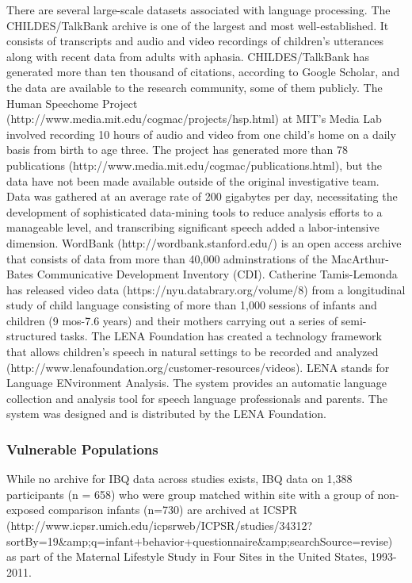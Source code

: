 \documentclass[letterpaper,man,apacite]{apa6}
\begin{document}
There are several large-scale datasets associated with language processing.
The CHILDES/TalkBank \cite{macwhinney_childes_2001} archive is one of the largest and most well-established.
It consists of transcripts and audio and video recordings of children's utterances along with recent data from adults with aphasia.
CHILDES/TalkBank has generated more than ten thousand of citations, according to Google Scholar, and the data are available to the research community, some of them publicly.
The Human Speechome Project (http://www.media.mit.edu/cogmac/projects/hsp.html) at MIT's Media Lab involved recording 10 hours of audio and video from one child's home on a daily basis from birth to age three.
The project has generated more than 78 publications (http://www.media.mit.edu/cogmac/publications.html), but the data have not been made available outside of the original investigative team.
Data was gathered at an average rate of 200 gigabytes per day, necessitating the development of sophisticated data-mining tools to reduce analysis efforts to a manageable level, and transcribing significant speech added a labor-intensive dimension.
WordBank (http://wordbank.stanford.edu/) is an open access archive that consists of data from more than 40,000 adminstrations of the MacArthur-Bates Communicative Development Inventory (CDI).
Catherine Tamis-Lemonda has released video data (https://nyu.databrary.org/volume/8) from a longitudinal study of child language consisting of more than 1,000 sessions of infants and children (9 mos-7.6 years) and their mothers carrying out a series of semi-structured tasks.
The LENA Foundation has created a technology framework that allows children's speech in natural settings to be recorded and analyzed (http://www.lenafoundation.org/customer-resources/videos).
LENA stands for Language ENvironment Analysis.
The system provides an automatic language collection and analysis tool for speech language professionals and parents.
The system was designed and is distributed by the LENA Foundation.

\subsubsection{Vulnerable Populations}

While no archive for IBQ data across studies exists, IBQ data on 1,388 participants (n = 658) who were group matched within site with a group of non-exposed comparison infants (n=730) are archived at ICSPR (http://www.icpsr.umich.edu/icpsrweb/ICPSR/studies/34312?sortBy=19&amp;q=infant+behavior+questionnaire&amp;searchSource=revise) as part of the Maternal Lifestyle Study in Four Sites in the United States, 1993-2011.
\end{document}
